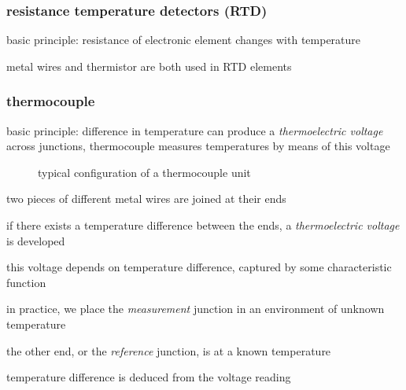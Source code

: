\subsubsection*{resistance temperature detectors (RTD)}

basic principle: resistance of electronic element changes with temperature

metal wires and thermistor are both used in RTD elements 


\subsubsection*{thermocouple}

basic principle: difference in temperature can produce a \emph{thermoelectric voltage} across junctions, thermocouple measures temperatures by means of this voltage

\begin{figure}[ht]
	\centering
	
	\caption*{typical configuration of a thermocouple unit}
\end{figure}

two pieces of different metal wires are joined at their ends

if there exists a temperature difference between the ends, a \emph{thermoelectric voltage} is developed

this voltage depends on temperature difference, captured by some characteristic function

in practice, we place the \emph{measurement} junction in an environment of unknown temperature

the other end, or the \emph{reference} junction, is at a known temperature

temperature difference is deduced from the voltage reading


